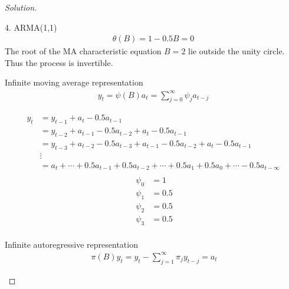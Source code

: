 \documentclass[UTF8,a4paper,14pt]{ctexart}
\newenvironment{solution}
  {\renewcommand\qedsymbol{$\blacksquare$}\begin{proof}[Solution]}
  {\end{proof}}
\theoremstyle{definition}
\theoremstyle{remark}
\begin{document}
\begin{solution}
\begin{mybox}{4. ARMA(1,1)}
    \begin{equation}
      \begin{aligned}
        \theta(B)= 1-0.5B =0
      \end{aligned}
    \end{equation}
    The root of the MA characteristic equation \(B=2\) lie outside the unity circle. Thus the process is invertible.
  
    Infinite moving average representation
    \begin{equation}
      \begin{aligned}
      y_t = \psi(B)a_t =\sum_{j = 0}^{\infty} \psi_j a_{t-j} 
      \end{aligned}
    \end{equation}
    
    \begin{equation}
      \begin{aligned}
        y_t &=  y_{t-1}+a_t -0.5a_{t-1} \\
        &=y_{t-2}+a_{t-1}-0.5a_{t-2}+a_t -0.5a_{t-1}\\
        &=y_{t-3}+a_{t-2}-0.5a_{t-3} +a_{t-1}-0.5a_{t-2}+a_t -0.5a_{t-1}\\
        &
        \vdots\\
        &=a_{t}+\cdots+0.5a_{t-1}+0.5a_{t-2}+\cdots+0.5a_{1}+0.5a_{0}+\cdots-0.5a_{t-\infty}\\
      \end{aligned}
    \end{equation}
    \begin{equation}\
      \begin{aligned}
      \psi_0 &= 1\\
      \psi_1 &= 0.5\\
      \psi_2 &= 0.5\\
      \psi_3 &= 0.5\\
    \end{aligned}
    \end{equation}
    

    Infinite autoregressive representation
    \begin{equation}\
      \begin{aligned}
        \pi(B)y_t = y_t -\sum_{j=1}^{\infty} \pi_j y_{t-j} =a_t
      \end{aligned}
    \end{equation}


\end{mybox}
\end{solution}
\end{document}
